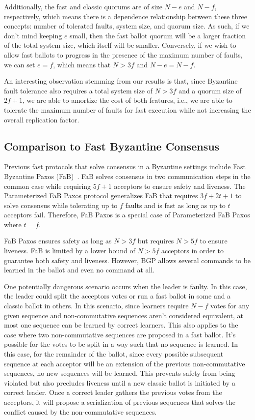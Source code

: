 Additionally, the fast and classic quorums are of size $N-e$ and $N-f$, respectively, which means there is a dependence relationship between these three concepts: number of tolerated faults, system size, and quorum size. As such, if we don't mind keeping $e$ small, then the fast ballot quorum will be a larger fraction of the total system size, which itself will be smaller. Conversely, if we wish to allow fast ballots to progress in the presence of the maximum number of faults, we can set $e=f$, which means that $N >3f$ and $N-e=N-f$. \par 
An interesting observation stemming from our results is that, since Byzantine fault tolerance also requires a total system size of $N>3f$ and a quorum size of $2f+1$, we are able to amortize the cost of both features, i.e., we are able to tolerate the maximum number of faults for fast execution while not increasing the overall replication factor.

\subsection{Comparison to Fast Byzantine Consensus}
Previous fast protocols that solve consensus in a Byzantine settings include Fast Byzantine Paxos (FaB)~\cite{Martin2006}. FaB solves consensus in two communication steps in the common case while requiring $5f+1$ acceptors to ensure safety and liveness. The Parameterized FaB Paxos protocol generalizes FaB that requires $3f+2t+1$ to solve consensus while tolerating up to $f$ faults and is fast as long as up to $t$ acceptors fail. Therefore, FaB Paxos is a special case of Parameterized FaB Paxos where $t=f$. \par
FaB Paxos ensures safety as long as $N>3f$ but requires $N
>5f$ to ensure liveness. FaB is limited by a lower bound of $N > 5f$ acceptors in order to guarantee both safety and liveness. However, BGP allows several commands to be learned in the ballot and even no command at all. \par
One potentially dangerous scenario occurs when the leader is faulty. In this case, the leader could split the acceptors votes or run a fast ballot in some and a classic ballot in others. In this scenario, since learners require $N-f$ votes for any given sequence and non-commutative sequences aren't considered equivalent, at most one sequence can be learned by correct learners. This also applies to the case where two non-commutative sequences are proposed in a fast ballot. It's possible for the votes to be split in a way such that no sequence is learned. In this case, for the remainder of the ballot, since every possible subsequent sequence at each acceptor will be an extension of the previous non-commutative sequences, no new sequences will be learned. This prevents safety from being violated but also precludes liveness until a new classic ballot is initiated by a correct leader. Once a correct leader gathers the previous votes from the acceptors, it will propose a serialization of previous sequences that solves the conflict caused by the non-commutative sequences.

